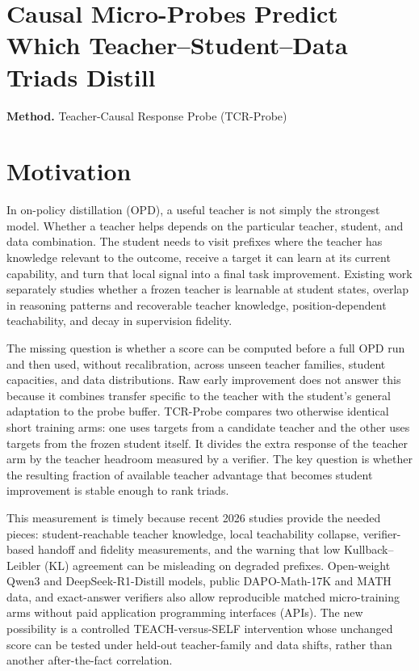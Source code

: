 \documentclass[10pt,a4paper]{article}
\begin{document}
\section*{Causal Micro-Probes Predict Which Teacher--Student--Data Triads Distill}
\textbf{Method.} Teacher-Causal Response Probe (TCR-Probe)
\section*{Motivation}
In on-policy distillation (OPD), a useful teacher is not simply the strongest model. Whether a teacher helps depends on the particular teacher, student, and data combination. The student needs to visit prefixes where the teacher has knowledge relevant to the outcome, receive a target it can learn at its current capability, and turn that local signal into a final task improvement. Existing work separately studies whether a frozen teacher is learnable at student states, overlap in reasoning patterns and recoverable teacher knowledge, position-dependent teachability, and decay in supervision fidelity.

The missing question is whether a score can be computed before a full OPD run and then used, without recalibration, across unseen teacher families, student capacities, and data distributions. Raw early improvement does not answer this because it combines transfer specific to the teacher with the student's general adaptation to the probe buffer. TCR-Probe compares two otherwise identical short training arms: one uses targets from a candidate teacher and the other uses targets from the frozen student itself. It divides the extra response of the teacher arm by the teacher headroom measured by a verifier. The key question is whether the resulting fraction of available teacher advantage that becomes student improvement is stable enough to rank triads.

This measurement is timely because recent 2026 studies provide the needed pieces: student-reachable teacher knowledge, local teachability collapse, verifier-based handoff and fidelity measurements, and the warning that low Kullback--Leibler (KL) agreement can be misleading on degraded prefixes. Open-weight Qwen3 and DeepSeek-R1-Distill models, public DAPO-Math-17K and MATH data, and exact-answer verifiers also allow reproducible matched micro-training arms without paid application programming interfaces (APIs). The new possibility is a controlled TEACH-versus-SELF intervention whose unchanged score can be tested under held-out teacher-family and data shifts, rather than another after-the-fact correlation.
\end{document}
